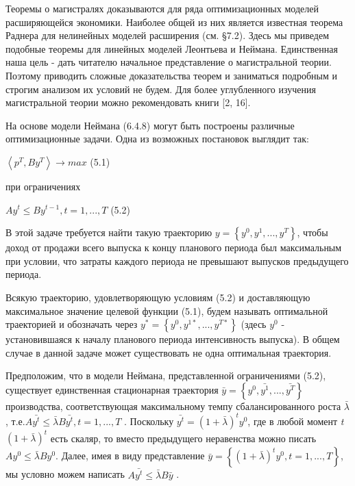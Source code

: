 \documentclass[12pt, 4paper]{book}
\begin{document}
{Теоремы о магистралях доказываются для ряда оптимизационных моделей расширяющейся экономики. Наиболее общей из них является известная теорема Раднера для нелинейных моделей расширения (см. §7.2). Здесь мы приведем подобные теоремы для линейных моделей Леонтьева и Неймана. Единственная наша цель - дать читателю начальное представление о магистральной теории. Поэтому приводить сложные доказательства теорем и заниматься подробным и строгим анализом их условий не будем. Для более углубленного изучения магистральной теории можно рекомендовать книги [2, 16].
\par

На основе модели Неймана (6.4.8) могут быть построены различные оптимизационные задачи. Одна из возможных постановок выглядит так:
\begin{center}
$\left\langle p^T,B y^T \right\rangle \rightarrow max$ (5.1)
\end{center}
\begin{center}
при ограничениях
\end{center}
\begin{center}
$A y^t \leq B y^{t-1}, t=1,...,T$ (5.2)
\end{center}
В этой задаче требуется найти такую траекторию $y=\left\{y^0, y^1,...,y^T \right\}$, чтобы доход от продажи всего выпуска к концу планового периода был максимальным при условии, что затраты каждого периода не превышают выпусков предыдущего периода.
\par

Всякую траекторию, удовлетворяющую условиям (5.2) и доставляющую максимальное значение целевой функции (5.1), будем называть оптимальной траекторией и обозначать через $y^{*}=\left\{y^0,y^{1*},...,y^{T*}\right\}$ (здесь $y^{0}$ - установившаяся к началу планового периода интенсивность выпуска). В общем случае в данной задаче может существовать не одна оптимальная траектория.
\par

Предположим, что в модели Неймана, представленной ограничениями (5.2), существует единственная стационарная траектория $\bar{y}=\left\{y^0,\bar{y^1},...,\bar{y^T}\right\}$ производства, соответствующая максимальному темпу сбалансированного роста $\bar{\lambda}$, т.е.$A \bar{y^t}\leq \bar{\lambda}B \bar{y^t}, t=1,...,T$ . Поскольку $\bar{y^t}=(1+\bar{\lambda})^t y^0$, где в любой момент \textit{t}$(1+\bar{\lambda})^t$ есть скаляр, то вместо предыдущего неравенства можно писать $Ay^0 \leq \bar{\lambda}B y^0$. Далее, имея в виду представление $\bar{y}=\left\{(1+\bar{\lambda})^t y^0, t=1,...,T\right\}$, мы условно можем написать $A\bar{y^t}\leq \bar{\lambda}B \bar{y}$ .
\par

}
\end{document}
